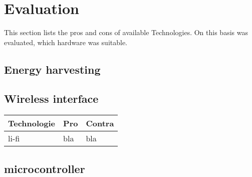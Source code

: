 \section{Evaluation}
This section lists the pros and cons of available Technologies.
On this basis was evaluated, which hardware was suitable.

\subsection{Energy harvesting}



\subsection{Wireless interface}
\begin{tabularx}{\linewidth}{|X|Y|Y|}
	\textbf{Technologie}&Pro&Contra\\
	\hline
	li-fi&bla&bla\\
	\hline
	
	
\end{tabularx}




\subsection{microcontroller}

